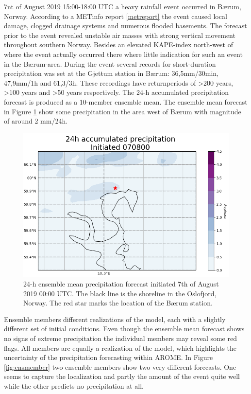 7nt of August 2019 15:00-18:00 UTC a heavy rainfall event occurred in Bærum, Norway. According to a METinfo report \ref{metreport} the event caused local damage, clogged drainage systems and numerous flooded basements. The forecast prior to the event revealed unstable air masses with strong vertical movement throughout southern Norway. Besides an elevated KAPE-index north-west of where the event actually occurred there where little indication for such an event in the Bærum-area. During the event several records for short-duration precipitation was set at the Gjettum station in Bærum: 36,5mm/30min, 47,9mm/1h and 61,3/3h. These recordings have returnperiods of >200 years, >100 years and >50 years respectively. The 24-h accumulated precipitation forecast is produced as a 10-member ensemble mean. The ensemble mean forecast in Figure \ref{fig:ens_mean} show some precipitation in the area west of Bærum with magnitude of around 2 mm/24h.  

\begin{figure}[hbt!]
    \centering
    \includegraphics[scale=0.4]{figures/ens_mean.PNG}
    \caption{24-h ensemble mean precipitation forecast initiated 7th of August 2019 00:00 UTC. The black line is the shoreline in the Oslofjord, Norway. The red star marks the location of the Bærum station.}
    \label{fig:ens_mean}
\end{figure}

Ensemble members different realizations of the model, each with a slightly different set of initial conditions. Even though the ensemble mean forecast shows no signs of extreme precipitation the individual members may reveal some red flags. All members are equally a realization of the model, which highlights the uncertainty of the precipitation forecasting within AROME. In Figure \ref{fig:ensmember} two ensemble members show two very different forecasts. One seems to capture the localization and partly the amount of the event quite well while the other predicts no precipitation at all. 


